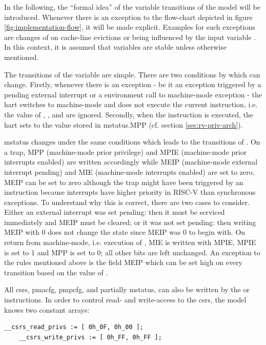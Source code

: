 In the following, the \enquote{formal idea} of the variable transitions of the model will be introduced.
Whenever there is an exception to the flow-chart depicted in figure \ref{fig:implementation-flow}, it will be made explicit.
Examples for such exceptions are changes of  on cache-line evictions or  being influenced by the input variable .
In this context, it is assumed that variables are stable unless otherwise mentioned.

The transitions of the  variable are simple.
There are two conditions by which  can change.
Firstly, whenever there is an exception - be it an exception triggered by a pending external interrupt or a environment call to machine-mode exception - the \gls{hart} switches to machine-mode and does not execute the current instruction, i.e. the value of , ,  and  are ignored.
Secondly, when the  instruction is executed, the \gls{hart} sets  to the value stored in \gls{mstatus}.MPP (cf. section \ref{sec:rv-priv-arch}).

\gls{mstatus} changes under the same conditions which leads to the transitions of .
On a trap, MPP (machine-mode prior privilege) and MPIE (machine-mode prior interrupts enabled) are written accordingly while MEIP (machine-mode external interrupt pending) and MIE (machine-mode interrupts enabled) are set to zero.
MEIP can be set to zero although the trap might have been triggered by an  instruction because interrupts have higher priority in RISC-V than synchronous exceptions.
To understand why this is correct, there are two cases to consider.
Either an external interrupt was set pending: then it must be serviced immediately and MEIP must be cleared; or it was not set pending: then writing MEIP with 0 does not change the state since MEIP was 0 to begin with.
On return from machine-mode, i.e. execution of , MIE is written with MPIE, MPIE is set to 1 and MPP is set to 0; all other bits are left unchanged.
An exception to the rules mentioned above is the field MEIP which can be set high on every transition based on the value of .

All \glspl{csr}, \gls{pmacfg}, \gls{pmpcfg}, and partially \gls{mstatus}, can also be written by the  or  instructions.
In order to control read- and write-access to the \glspl{csr}, the model knows two constant arrays:
\begin{lstlisting}[language=smv]
    __csrs_read_privs := [ 0h_0F, 0h_00 ];
    __csrs_write_privs := [ 0h_FF, 0h_FF ];
\end{lstlisting}

